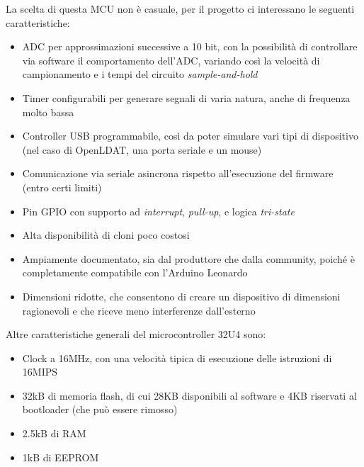 La scelta di questa MCU non è casuale, per il progetto ci interessano le seguenti caratteristiche:
\begin{itemize}
	\item ADC per approssimazioni successive a 10 bit, con la possibilità di controllare via software il comportamento dell'ADC, variando così la velocità di campionamento e i tempi del circuito \textit{sample-and-hold}
	\item Timer configurabili per generare segnali di varia natura, anche di frequenza molto bassa
	\item Controller USB programmabile, così da poter simulare vari tipi di dispositivo (nel caso di OpenLDAT, una porta seriale e un mouse)
	\item Comunicazione via seriale asincrona rispetto all'esecuzione del firmware (entro certi limiti)
	\item Pin GPIO con supporto ad \textit{interrupt}, \textit{pull-up}, e logica \textit{tri-state}
	\item Alta disponibilità di cloni poco costosi
	\item Ampiamente documentato, sia dal produttore che dalla community, poiché è completamente compatibile con l'Arduino Leonardo
	\item Dimensioni ridotte, che consentono di creare un dispositivo di dimensioni ragionevoli e che riceve meno interferenze dall'esterno
\end{itemize}

Altre caratteristiche generali del microcontroller 32U4 sono:
\begin{itemize}
	\item Clock a 16MHz, con una velocità tipica di esecuzione delle istruzioni di 16MIPS
	\item 32kB di memoria flash, di cui 28KB disponibili al software e 4KB riservati al bootloader (che può essere rimosso)
	\item 2.5kB di RAM
	\item 1kB di EEPROM
\end{itemize}

